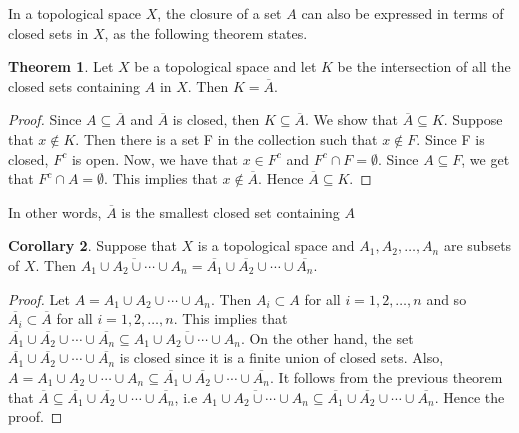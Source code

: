 \documentclass[11pt,a4paper]{article}
\theoremstyle{definition}
\newtheorem{thm}{Theorem}[subsection]
\newtheorem{coro}[thm]{Corollary}
\begin{document}
In a topological space $X$, the closure of a set $A$ can also be expressed in terms of closed sets in $X$, as the following theorem states.


 
\begin{thm}
Let $X$ be a topological space and let $K$ be the intersection of all the closed sets containing $A$ in $X$. Then $K=\overline{A}$.
\end{thm}

\begin{proof}
Since $A\subseteq \overline{A}$ and $\overline{A}$ is closed, then $K\subseteq \overline{A}$. We show that $\overline{A}\subseteq K$. Suppose that $x\not \in K$. Then there is a set F in the collection such that $x\not \in F$. Since F is closed, $F^c$ is open. Now, we have that $x\in F^c$ and $F^c\cap F=\emptyset$. Since $A\subseteq F$, we get that $F^c\cap A=\emptyset$. This implies that $x\not\in \overline{A}$. Hence $\overline{A}\subseteq K$.
\end{proof}


In other words, $\overline{A}$ is the smallest closed set containing $A$





\begin{coro}
Suppose that $X$ is a topological space and $A_1,A_2,\ldots,A_n$ are subsets of $X$. Then $\overline{A_1\cup A_2\cup\cdots\cup A_n}=\overline{A_1}\cup \overline{A_2}\cup\cdots\cup \overline{A_n}$.
\end{coro}

\begin{proof}
Let $A=A_1\cup A_2\cup\cdots\cup A_n$. Then $A_i\subset A$ for all $i=1,2,\ldots,n$ and so $\overline{A_i}\subset \overline{A}$ for all $i=1,2,\ldots,n$. This implies that $\overline{A_1}\cup \overline{A_2}\cup\cdots\cup \overline{A_n}\subseteq \overline{A_1\cup A_2\cup\cdots\cup A_n}$. On the other hand, the set $\overline{A_1}\cup \overline{A_2}\cup\cdots\cup \overline{A_n}$ is closed since it is a finite union of closed sets. Also,\, $A=A_1\cup A_2 \cup\cdots\cup A_n\subseteq \overline{A_1}\cup \overline{A_2}\cup\cdots\cup \overline{A_n}$. It follows from the previous theorem that $\overline{A}\subseteq \overline{A_1}\cup \overline{A_2}\cup\cdots\cup \overline{A_n}$, i.e $\overline{A_1\cup A_2\cup\cdots\cup A_n}\subseteq \overline{A_1}\cup \overline{A_2}\cup\cdots\cup \overline{A_n}$. Hence the proof.
\end{proof}
\end{document}
